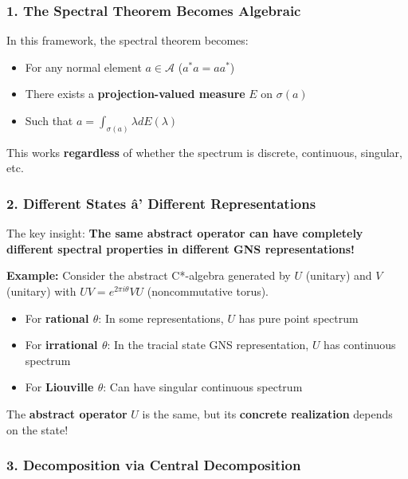 \documentclass[aps,prl,reprint]{revtex4-2}
\begin{document}
\subsubsection*{1. The Spectral Theorem Becomes Algebraic}

In this framework, the spectral theorem becomes:

\begin{itemize}
\item For any normal element $a \in \mathcal{A}$ ($a^*a = aa^*$)

\item There exists a \textbf{projection-valued measure} $E$ on $\sigma(a)$

\item Such that $a = \int_{\sigma(a)} \lambda dE(\lambda)$
\end{itemize}

This works \textbf{regardless} of whether the spectrum is discrete,
continuous, singular, etc.

\subsubsection*{2. Different States \^{a}\dag ' Different Representations}

The key insight: \textbf{The same abstract operator can have completely
different spectral properties in different GNS representations!}

\textbf{Example:} Consider the abstract C*-algebra generated by $U$
(unitary) and $V$ (unitary) with $UV = e^{2\pi i\theta}VU$ (noncommutative
torus).

\begin{itemize}
\item For \textbf{rational $\theta$}: In some representations, $U$ has pure
point spectrum

\item For \textbf{irrational $\theta$}: In the tracial state GNS
representation, $U$ has continuous spectrum

\item For \textbf{Liouville $\theta$}: Can have singular continuous spectrum
\end{itemize}

The \textbf{abstract operator} $U$ is the same, but its \textbf{concrete
realization} depends on the state!

\subsubsection*{3. Decomposition via Central Decomposition}
\end{document}
